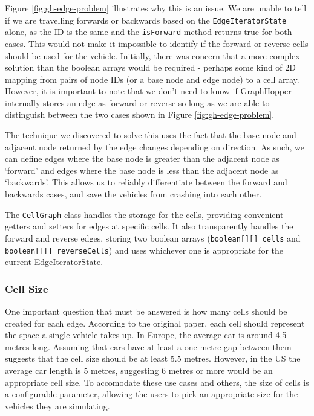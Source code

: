 \documentclass[ %
                    author={Alexander Hill},
                supervisor={Dr. Benjamin Sach},
                    degree={MEng},
                     title={MARMOSET},
                  subtitle={Multi-Agent Route Management using Online Simulation for Efficient Transportation},
                      type={research},
                      year={2016} ]{dissertation}
\begin{document}
Figure \ref{fig:gh-edge-problem} illustrates why this is an issue. We are unable
to tell if we are travelling forwards or backwards based on the
\texttt{EdgeIteratorState} alone, as the ID is the same and the
\texttt{isForward} method returns true for both cases. This would not make it
impossible to identify if the forward or reverse cells should be used for the
vehicle. Initially, there was concern that a more complex solution than the
boolean arrays would be required - perhaps some kind of 2D mapping from pairs of
node IDs (or a base node and edge node) to a cell array. However, it is
important to note that we don't need to know if GraphHopper internally stores an
edge as forward or reverse so long as we are able to distinguish between the two
cases shown in Figure \ref{fig:gh-edge-problem}.

The technique we discovered to solve this uses the fact that the base node and
adjacent node returned by the edge changes depending on direction. As such, we
can define edges where the base node is greater than the adjacent node as
`forward' and edges where the base node is less than the adjacent node as
`backwards'. This allows us to reliably differentiate between the forward and
backwards cases, and save the vehicles from crashing into each other.

The \texttt{CellGraph} class handles the storage for the cells, providing
convenient getters and setters for edges at specific cells. It also
transparently handles the forward and reverse edges, storing two boolean arrays
(\texttt{boolean[][] cells} and \texttt{boolean[][] reverseCells}) and uses
whichever one is appropriate for the current EdgeIteratorState.

\subsubsection{Cell Size}\label{sec:cell-size}

One important question that must be answered is how many cells should be created
for each edge. According to the original paper, each cell should represent the
space a single vehicle takes up. In Europe, the average car is around 4.5 metres
long. Assuming that cars have at least a one metre gap between them suggests
that the cell size should be at least 5.5 metres. However, in the US the average car
length is 5 metres, suggesting 6 metres or more would be an appropriate cell
size. To accomodate these use cases and others, the size of cells is a
configurable parameter, allowing the users to pick an appropriate size for the
vehicles they are simulating.
\end{document}
